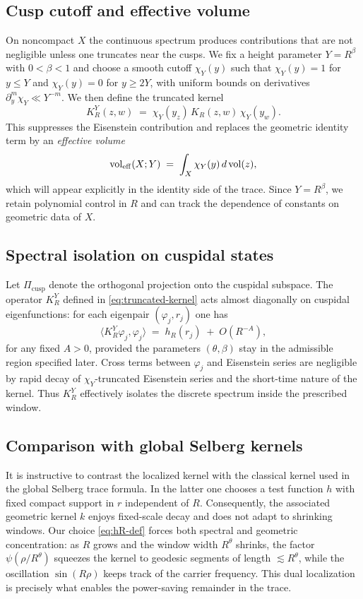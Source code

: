 \subsection{Cusp cutoff and effective volume}\label{subsec:cusp-cutoff}
On noncompact $X$ the continuous spectrum produces contributions that are not negligible unless one truncates near the cusps. We fix a height parameter $Y=R^\beta$ with $0<\beta<1$ and choose a smooth cutoff $\chi_Y(y)$ such that $\chi_Y(y)=1$ for $y\le Y$ and $\chi_Y(y)=0$ for $y\ge 2Y$, with uniform bounds on derivatives $\partial_y^m\chi_Y \ll Y^{-m}$. We then define the truncated kernel
\begin{equation}\label{eq:truncated-kernel}
K_R^Y(z,w) \;=\; \chi_Y(y_z)\, K_R(z,w)\, \chi_Y(y_w).
\end{equation}
This suppresses the Eisenstein contribution and replaces the geometric identity term by an \emph{effective volume}
\[
\operatorname{vol}_{\mathrm{eff}}(X;Y) \;=\; \int_X \chi_Y(y)\, d\operatorname{vol}(z),
\]
which will appear explicitly in the identity side of the trace. Since $Y=R^\beta$, we retain polynomial control in $R$ and can track the dependence of constants on geometric data of $X$.

\subsection{Spectral isolation on cuspidal states}\label{subsec:spectral-isolation}
Let $\Pi_{\mathrm{cusp}}$ denote the orthogonal projection onto the cuspidal subspace. The operator $K_R^Y$ defined in \eqref{eq:truncated-kernel} acts almost diagonally on cuspidal eigenfunctions: for each eigenpair $(\varphi_j,r_j)$ one has
\begin{equation}\label{eq:diagonal}
\langle K_R^Y \varphi_j,\varphi_j\rangle
\;=\; h_R(r_j)\;+\;O(R^{-\!A}),
\end{equation}
for any fixed $A>0$, provided the parameters $(\theta,\beta)$ stay in the admissible region specified later. Cross terms between $\varphi_j$ and Eisenstein series are negligible by rapid decay of $\chi_Y$-truncated Eisenstein series and the short-time nature of the kernel. Thus $K_R^Y$ effectively isolates the discrete spectrum inside the prescribed window.

\subsection{Comparison with global Selberg kernels}\label{subsec:comparison}
It is instructive to contrast the localized kernel with the classical kernel used in the global Selberg trace formula. In the latter one chooses a test function $h$ with fixed compact support in $r$ independent of $R$. Consequently, the associated geometric kernel $k$ enjoys fixed-scale decay and does not adapt to shrinking windows. Our choice \eqref{eq:hR-def} forces both spectral and geometric concentration: as $R$ grows and the window width $R^\theta$ shrinks, the factor $\psi(\rho/R^\theta)$ squeezes the kernel to geodesic segments of length $\lesssim R^\theta$, while the oscillation $\sin(R\rho)$ keeps track of the carrier frequency. This dual localization is precisely what enables the power-saving remainder in the trace.
